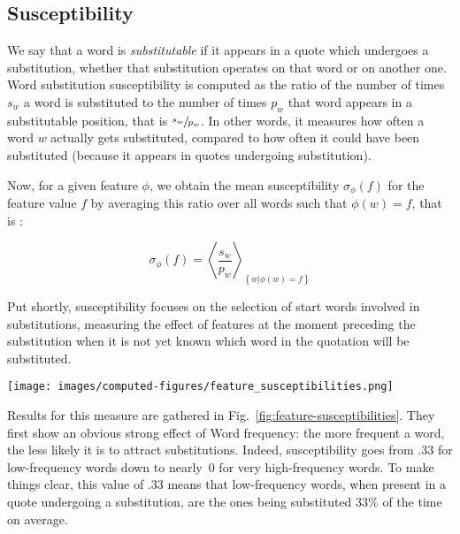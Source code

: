 \subsection{Susceptibility}

We say that a word is \emph{substitutable} if it appears in a quote which undergoes a substitution, whether that substitution operates on that word or on another one.
Word substitution susceptibility is computed as the ratio of the number of times $s_w$ a word is substituted to the number of times $p_w$ that word appears in a substitutable position, that is $\sfrac{s_w}{p_w}$. {In other words, it measures how often a word $w$ actually gets substituted, compared to how often it could have been substituted (because it appears in quotes undergoing substitution)}.

Now, for a given feature $\phi$, we obtain the mean susceptibility $\sigma_{\phi}(f)$ for the feature value $f$ by averaging this ratio over all words such that $\phi(w) = f$, that is%
:

$$\sigma_{\phi}(f) = \left< \frac{s_w}{p_w} \right>_{\left\lbrace w | \phi(w) = f \right\rbrace}$$

Put shortly, susceptibility focuses on the selection of start words involved in substitutions, measuring the effect of features at the moment preceding the substitution when it is not yet known which word in the quotation will be substituted.

\begin{figure*}[!th]
    \centering
    \texttt{[image: images/computed-figures/feature\_susceptibilities.png]}
    \caption{\textbf{Substitution susceptibility:} average susceptibility to substitution versus average feature value of a candidate word for substitution, with 95\% asymptotic confidence intervals.
    The heatmap on the lower-right shows the joint effect of Number of synonyms and Number of phonemes on susceptibility, averaged over the respective single-variable ranges, with sample size (word numbers) in parentheses.}
    \label{fig:feature-susceptibilities}
\end{figure*}
\medskip
Results for this measure are gathered in Fig.~\ref{fig:feature-susceptibilities}. They first show an obvious strong effect of Word frequency: the more frequent a word, the less likely it is to attract substitutions.
Indeed, susceptibility goes from $.33$ for low-frequency words down to nearly~0 for very high-frequency words.
To make things clear, this value of $.33$ means that low-frequency words, when present in a quote undergoing a substitution, are the ones being substituted 33\% of the time on average.

